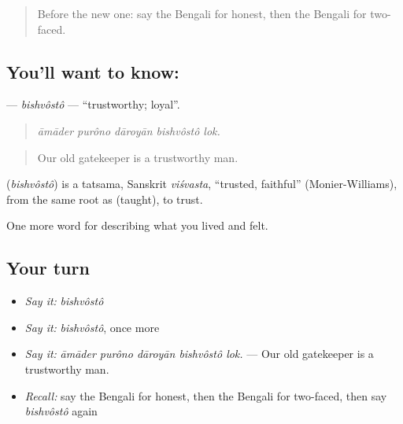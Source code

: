 \label{lesson:BN-C458-bishvosto}



\begin{quote}
Before the new one: say the Bengali for honest, then the Bengali for two-faced.
\end{quote}

\subsection*{You'll want to know: }
\textbf{} — \emph{bishvôstô} — \textquotedblleft{}trustworthy; loyal\textquotedblright{}.

\begin{quote}
    
\end{quote}

\begin{quote}
\emph{āmāder purôno dāroyān bishvôstô lok.}
\end{quote}

\begin{quote}
Our old gatekeeper is a trustworthy man.
\end{quote}

\begin{cousinweb}
\textbf{} (\emph{bishvôstô}) is a tatsama, Sanskrit \emph{viśvasta}, \textquotedblleft{}trusted, faithful\textquotedblright{} (Monier-Williams), from the same root as   (taught), to trust.
\end{cousinweb}

\begin{grammarlens}[title={What you've built}]
One more word for describing what you lived and felt.
\end{grammarlens}

\subsection*{Your turn}
\begin{itemize}
\raggedright
  \item \emph{Say it:} \emph{bishvôstô}
  \item \emph{Say it:} \emph{bishvôstô}, once more
  \item \emph{Say it:} \emph{āmāder purôno dāroyān bishvôstô lok.} — Our old gatekeeper is a trustworthy man.
  \item \emph{Recall:} say the Bengali for honest, then the Bengali for two-faced, then say \emph{bishvôstô} again
\end{itemize}

